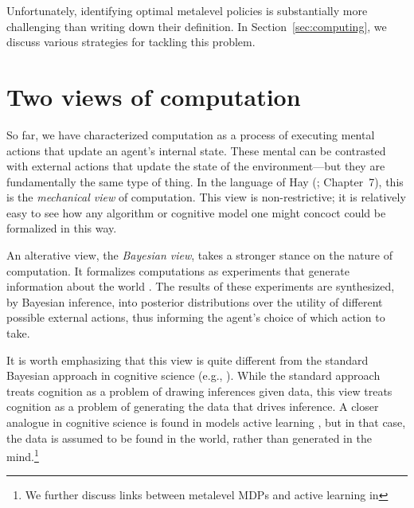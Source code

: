 Unfortunately, identifying optimal metalevel policies is substantially more challenging than writing down their definition. In Section~\ref{sec:computing}, we discuss various strategies for tackling this problem.


\section{Two views of computation}\label{sec:two-views}

So far, we have characterized computation as a process of executing mental actions that update an agent's internal state. These mental can be contrasted with external actions that update the state of the environment---but they are fundamentally the same type of thing. In the language of Hay (\citeyear{hay2016principles}; Chapter~7), this is the \emph{mechanical view} of computation. This view is non-restrictive; it is relatively easy to see how any algorithm or cognitive model one might concoct could be formalized in this way.

An alterative view, the \emph{Bayesian view}, takes a stronger stance on the nature of computation. It formalizes computations as experiments that generate information about the world \citep{matheson1968economic}. The results of these experiments are synthesized, by Bayesian inference, into posterior distributions over the utility of different possible external actions, thus informing the agent's choice of which action to take. 

It is worth emphasizing that this view is quite different from the standard Bayesian approach in cognitive science (e.g., \citealp{tenenbaum2011how}). While the standard approach treats cognition as a problem of drawing inferences given data, this view treats cognition as a problem of generating the data that drives inference. A closer analogue in cognitive science is found in models active learning \citep{gureckis2012selfdirected,gottlieb2013informationseeking}, but in that case, the data is assumed to be found in the world, rather than generated in the mind.\footnote{We further discuss links between metalevel MDPs and active learning in \conclusion}

